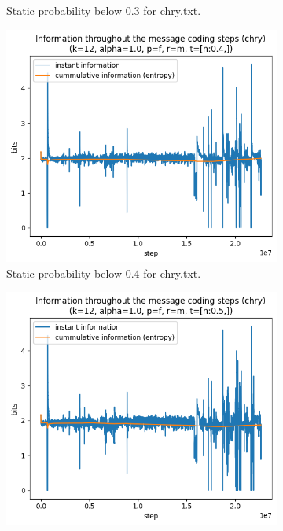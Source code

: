 \documentclass{article}
\begin{document}
\begin{figure}
\begin{subfigure}[b]{0.3\textwidth}
\begin{center}
        \end{center}
        \caption{Static probability below 0.3 for chry.txt.}
        \label{fig:results-threshold-n-0.3}
    \end{subfigure}
    \hfill
    \begin{subfigure}[b]{0.3\textwidth}
        \begin{center}
            \includegraphics[width=1.0\linewidth]{../scripts/images/chry_12_1.0_f_m_[n:0.4,].png}
        \end{center}
        \caption{Static probability below 0.4 for chry.txt.}
        \label{fig:results-threshold-n-0.4}
    \end{subfigure}
    \hfill
    \begin{subfigure}[b]{0.3\textwidth}
        \begin{center}
            \includegraphics[width=1.0\linewidth]{../scripts/images/chry_12_1.0_f_m_[n:0.5,].png}

\end{center}
\end{subfigure}
\end{figure}
\end{document}
